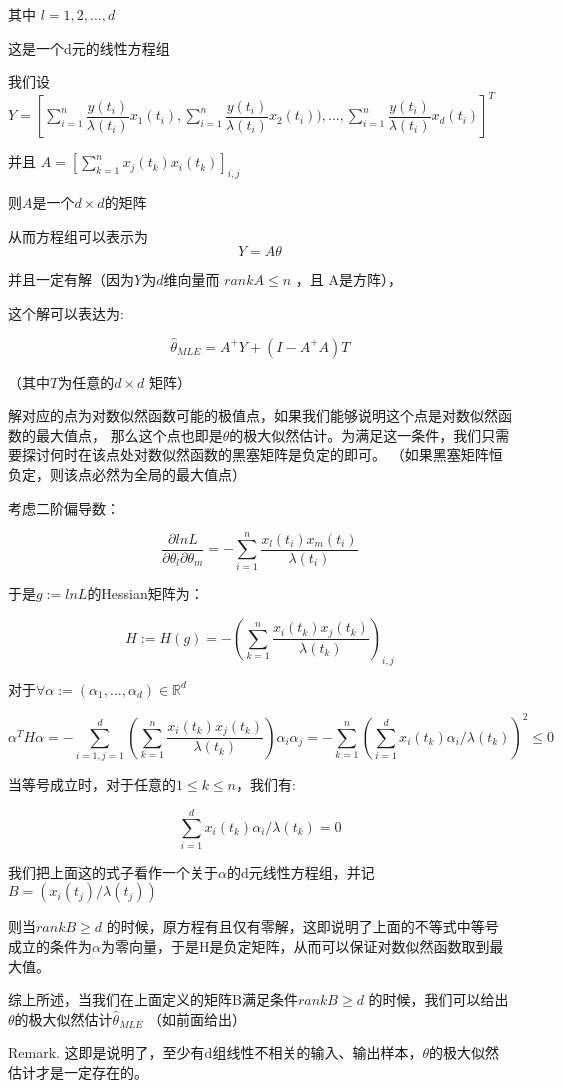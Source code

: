 \documentclass[12pt, a4paper]{ctexart}
\begin{document}
\begin{flushleft}
    其中 $l=1,2,...,d$

    这是一个d元的线性方程组

    我们设$Y=[\sum_{i=1}^n \dfrac{y(t_i)}{\lambda(t_i)} x_1(t_i),\sum_{i=1}^n \dfrac{y(t_i)}{\lambda(t_i)} x_2(t_i)),...,\sum_{i=1}^n \dfrac{y(t_i)}{\lambda(t_i)} x_d(t_i)]^T$

    并且 $A= [\sum_{k=1}^nx_j(t_k)x_i(t_k)]_{i,j}$

    则$A$是一个$d\times d$的矩阵

    从而方程组可以表示为\[
        Y = A\theta
    \]

    并且一定有解（因为$Y$为$d$维向量而 $rank A \leq n$ ，且 A是方阵），

    这个解可以表达为:

    \[
        \hat{\theta}_{MLE}= A^+Y+(I-A^+A)T
    \]

    （其中$T$为任意的$d\times d$ 矩阵）

    解对应的点为对数似然函数可能的极值点，如果我们能够说明这个点是对数似然函数的最大值点，
    那么这个点也即是$\theta$的极大似然估计。为满足这一条件，我们只需要探讨何时在该点处对数似然函数的黑塞矩阵是负定的即可。
    （如果黑塞矩阵恒负定，则该点必然为全局的最大值点）

    考虑二阶偏导数：
    
    \[
        \dfrac {\partial lnL}{\partial\theta_l\partial\theta_m} = - \sum^{n}_{i=1} \dfrac{x_l(t_i)x_m(t_i)}{\lambda(t_i)}
    \]

    于是$g:=ln L$的Hessian矩阵为：

    \[
        H:=H(g) = -(\sum^{n}_{k=1} \dfrac{x_i(t_k)x_j(t_k)}{\lambda(t_k)})_{i,j}
    \]

    对于$\forall \alpha :=(\alpha_1,...,\alpha_d) \in \mathbb{R}^d$

    \[
        \alpha^T H \alpha = -\sum_{i=1,j=1}^d(\sum^n_{k=1}\dfrac{x_i(t_k)x_j(t_k)}{\lambda(t_k)})\alpha_i\alpha_j=-\sum^{n}_{k=1}(\sum_{i=1}^dx_i(t_k)\alpha_i/\lambda(t_k))^2\leq 0
    \]

    当等号成立时，对于任意的$1\leq k \leq n$，我们有:

    \[
        \sum_{i=1}^dx_i(t_k)\alpha_i/\lambda(t_k) = 0
    \]

    我们把上面这的式子看作一个关于$\alpha$的d元线性方程组，并记$B=(x_i(t_j)/\lambda(t_j))$

    则当$rank B \geq d$ 的时候，原方程有且仅有零解，这即说明了上面的不等式中等号成立的条件为$\alpha$为零向量，于是H是负定矩阵，从而可以保证对数似然函数取到最大值。

    综上所述，当我们在上面定义的矩阵B满足条件$rank B \geq d$ 的时候，我们可以给出$\theta$的极大似然估计$\hat{\theta}_{MLE}$ （如前面给出）

    Remark. 这即是说明了，至少有d组线性不相关的输入、输出样本，$\theta$的极大似然估计才是一定存在的。
\end{flushleft}
\end{document}
